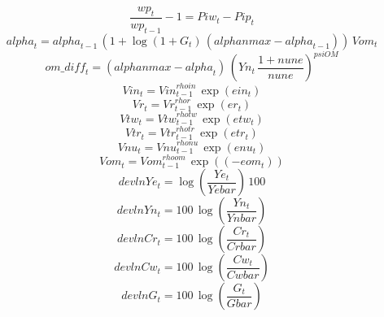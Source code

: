 \begin{dmath}
\frac{{wp}_{t}}{{wp}_{t-1}}-1={Piw}_{t}-{Pip}_{t}
\end{dmath}
\begin{dmath}
{alpha}_{t}={alpha}_{t-1}\, \left(1+\log\left(1+{G}_{t}\right)\, \left({alphanmax}-{alpha}_{t-1}\right)\right)\, {Vom}_{t}
\end{dmath}
\begin{dmath}
{om\_diff}_{t}=\left({alphanmax}-{alpha}_{t}\right)\, \left({Yn}_{t}\, \frac{1+{nune}}{{nune}}\right)^{{psiOM}}
\end{dmath}
\begin{dmath}
{Vin}_{t}={Vin}_{t-1}^{{rhoin}}\, \exp\left({ein}_{t}\right)
\end{dmath}
\begin{dmath}
{Vr}_{t}={Vr}_{t-1}^{{rhor}}\, \exp\left({er}_{t}\right)
\end{dmath}
\begin{dmath}
{Vtw}_{t}={Vtw}_{t-1}^{{rhotw}}\, \exp\left({etw}_{t}\right)
\end{dmath}
\begin{dmath}
{Vtr}_{t}={Vtr}_{t-1}^{{rhotr}}\, \exp\left({etr}_{t}\right)
\end{dmath}
\begin{dmath}
{Vnu}_{t}={Vnu}_{t-1}^{{rhonu}}\, \exp\left({enu}_{t}\right)
\end{dmath}
\begin{dmath}
{Vom}_{t}={Vom}_{t-1}^{{rhoom}}\, \exp\left(\left(-{eom}_{t}\right)\right)
\end{dmath}
\begin{dmath}
{devlnYe}_{t}=\log\left(\frac{{Ye}_{t}}{{Yebar}}\right)\, 100
\end{dmath}
\begin{dmath}
{devlnYn}_{t}=100\, \log\left(\frac{{Yn}_{t}}{{Ynbar}}\right)
\end{dmath}
\begin{dmath}
{devlnCr}_{t}=100\, \log\left(\frac{{Cr}_{t}}{{Crbar}}\right)
\end{dmath}
\begin{dmath}
{devlnCw}_{t}=100\, \log\left(\frac{{Cw}_{t}}{{Cwbar}}\right)
\end{dmath}
\begin{dmath}
{devlnG}_{t}=100\, \log\left(\frac{{G}_{t}}{{Gbar}}\right)
\end{dmath}
